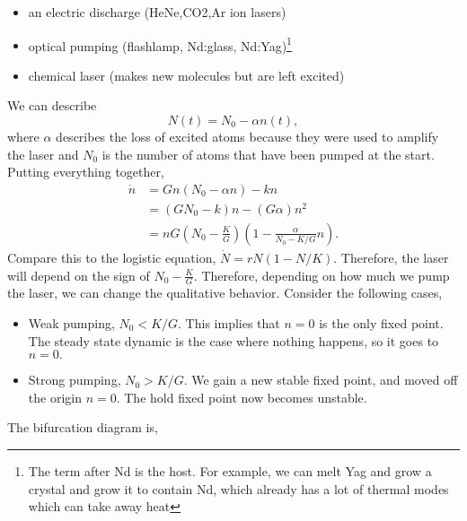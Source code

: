 \documentclass{article}
\numberwithin{equation}{section}
\begin{document}
\begin{example}
    \begin{itemize}
        \item an electric discharge (HeNe,CO2,Ar ion lasers)
        \item optical pumping (flashlamp, Nd:glass, Nd:Yag)\footnote{The term after Nd is the host. For example, we can melt Yag and grow a crystal and grow it to contain Nd, which already has a lot of thermal modes which can take away heat}
        \item chemical laser (makes new molecules but are left excited)
    \end{itemize}
    We can describe 
    \begin{equation}
        N(t) = N_0 - \alpha n(t),
    \end{equation}
    where $\alpha$ describes the loss of excited atoms because they were used to amplify the laser and $N_0$ is the number of atoms that have been pumped at the start. Putting everything together,
    \begin{align*}
        \dot{n} &= Gn(N_0 - \alpha n) - kn  \\ 
        &= (GN_0-k)n - (G\alpha)n^2 \\ 
        &= nG\left(N_0 - \frac{K}{G}\right)\left(1 - \frac{\alpha}{N_0 - K/G}n\right).
    \end{align*}
    Compare this to the logistic equation, $\dot{N} = rN\left(1-N/K\right).$ Therefore, the laser will depend on the sign of $N_0-\frac{K}{G}.$ Therefore, depending on how much we pump the laser, we can change the qualitative behavior. Consider the following cases,
    \begin{itemize}
        \item Weak pumping, $N_0 < K/G.$ This implies that $n=0$ is the only fixed point. The steady state dynamic is the case where nothing happens, so it goes to $n=0.$
        \item Strong pumping, $N_0 > K/G.$ We gain a new stable fixed point, and moved off the origin $n=0.$ The hold fixed point now becomes unstable.
    \end{itemize}
    The bifurcation diagram is,
    \begin{center}
    \end{center}
\end{example}
\end{document}
